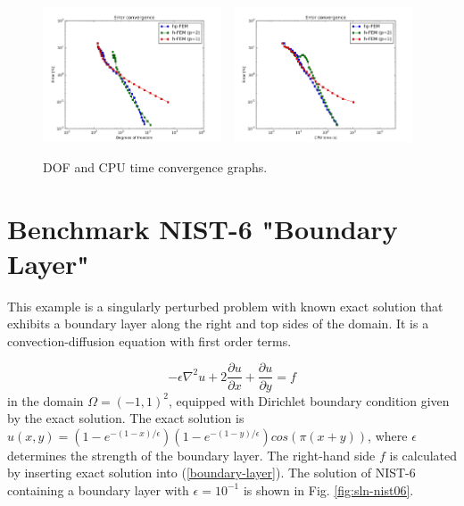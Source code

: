 \documentclass[12pt]{elsarticle}
\begin{document}
\begin{figure}[!ht]
\centering
\includegraphics[height=4cm]{nist/nist-5/conv_dof_aniso.png}\ \
\includegraphics[height=4cm]{nist/nist-5/conv_cpu_aniso.png}
\caption{DOF and CPU time convergence graphs.}
\label{fig:nist-5-conv}
\end{figure}





\section{Benchmark NIST-6 "Boundary Layer"}
\label{sec:bench-6}

This example is a singularly perturbed problem with known exact solution that exhibits
a boundary layer along the right and top sides of the domain.
It is a convection-diffusion equation with first order terms.

\begin{equation} \label{boundary-layer}
-\epsilon \nabla^{2} u + 2\frac{\partial u}{\partial x} + \frac{\partial u}{\partial y} = f
\end{equation}
in the domain $\Omega = (-1, 1)^2$, equipped with Dirichlet boundary condition
given by the exact solution. The exact solution is
$u(x,y) = (1 - e^{-(1 - x) / \epsilon})(1 - e^{-(1 - y) / \epsilon})cos(\pi (x + y))$,
where $\epsilon$ determines the strength of the boundary layer.
The right-hand side $f$ is calculated by inserting exact solution into (\ref{boundary-layer}).
The solution of NIST-6 containing a boundary layer
with $\epsilon = 10^{-1}$ is shown in Fig. \ref{fig:sln-nist06}.
\end{document}

